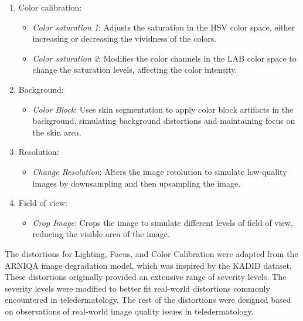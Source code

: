 \begin{enumerate}
\begin{itemize}
        \end{itemize}
    \item Color calibration:
        \begin{itemize}
            \item \textit{Color saturation 1}: Adjusts the saturation in the HSV color space, either increasing or decreasing the vividness of the colors.
            \item \textit{Color saturation 2}: Modifies the color channels in the LAB color space to change the saturation levels, affecting the color intensity.
        \end{itemize}
    \item Background:
        \begin{itemize}
            \item \textit{Color Block}: Uses skin segmentation to apply color block artifacts in the background, simulating background distortions and maintaining focus on the skin area.
        \end{itemize}
    \item Resolution:
        \begin{itemize}
            \item \textit{Change Resolution}: Alters the image resolution to simulate low-quality images by downsampling and then upsampling the image.
        \end{itemize}
    \item Field of view:
        \begin{itemize}
            \item \textit{Crop Image}: Crops the image to simulate different levels of field of view, reducing the visible area of the image.
        \end{itemize}
\end{enumerate}
\vspace{\baselineskip}
\noindent
The distortions for Lighting, Focus, and Color Calibration were adapted from the ARNIQA \autocite{ARNIQA} image degradation model, which was inspired by the KADID \autocite{KADID10k} dataset. These distortions originally provided an extensive range of severity levels. The severity levels were modified to better fit real-world distortions commonly encountered in teledermatology. The rest of the distortions were designed based on observations of real-world image quality issues in teledermatology. \par
\vspace{\baselineskip}
\noindent
